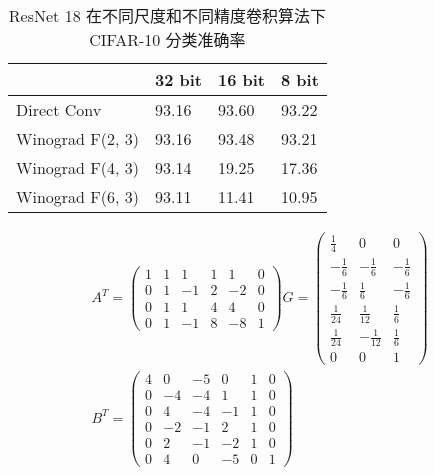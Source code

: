 \begin{table}[]
\centering
\caption{ResNet 18 在不同尺度和不同精度卷积算法下CIFAR-10 分类准确率}
\begin{tabular}{llll}
\hline
\multicolumn{1}{|l|}{}                 & \multicolumn{1}{l|}{32 bit} & \multicolumn{1}{l|}{16 bit} & \multicolumn{1}{l|}{8 bit} \\ \hline
\multicolumn{1}{|l|}{Direct  Conv}     & \multicolumn{1}{l|}{93.16}  & \multicolumn{1}{l|}{93.60}  & \multicolumn{1}{l|}{93.22} \\ \hline
\multicolumn{1}{|l|}{Winograd F(2, 3)} & \multicolumn{1}{l|}{93.16}  & \multicolumn{1}{l|}{93.48}  & \multicolumn{1}{l|}{93.21} \\ \hline
\multicolumn{1}{|l|}{Winograd F(4, 3)} & \multicolumn{1}{l|}{93.14}  & \multicolumn{1}{l|}{19.25}  & \multicolumn{1}{l|}{17.36} \\ \hline
\multicolumn{1}{|l|}{Winograd F(6, 3)} & \multicolumn{1}{l|}{93.11}  & \multicolumn{1}{l|}{11.41}  & \multicolumn{1}{l|}{10.95} \\ \hline
\end{tabular}
\label{tbl:winograd_acc}
\end{table}
\begin{align}
\label{eq:winograd_f43}
  A^T = 
  \begin{pmatrix}
      1 & 1 & 1 &  1 &  1 &  0\\
      0 & 1 & -1&  2 &  -2&  0\\
      0 & 1 & 1 &  4 &  4 &  0\\
      0 & 1 & -1&  8 &  -8&  1
  \end{pmatrix}
  G = 
  \begin{pmatrix}
    \frac{1}{4} & 0 & 0 \\
    -\frac{1}{6} & -\frac{1}{6} & -\frac{1}{6} \\
    -\frac{1}{6} & \frac{1}{6} & -\frac{1}{6} \\
    \frac{1}{24} & \frac{1}{12} & \frac{1}{6} \\
    \frac{1}{24} & -\frac{1}{12} & \frac{1}{6} \\
    0 & 0 & 1
  \end{pmatrix}\\
  B^T =
  \begin{pmatrix}
    4  & 0 &  -5 & 0  &  1&  0\\
    0  & -4&  -4 & 1  &  1&  0\\
    0  & 4 &  -4 & -1 &  1&  0\\
    0  & -2&  -1 & 2  &  1&  0\\
    0  & 2 &  -1 & -2 &  1&  0\\
    0  & 4 &  0  & -5 &  0&  1
  \end{pmatrix}
\end{align}

